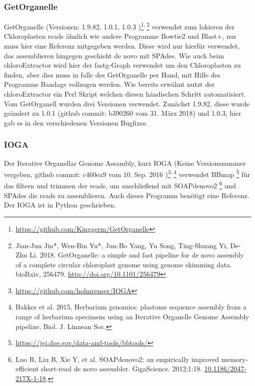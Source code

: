 \documentclass{scrartcl}
\begin{document}
\subsubsection{GetOrganelle}
\label{sec-1-5-5}
GetOrganelle (Versionen: 1.9.82, 1.0.1, 1.0.3 )\footnote{\url{https://github.com/Kinggerm/GetOrganelle}}\textsuperscript{,}\,\footnote{Jian-Jun Jin*, Wen-Bin Yu*, Jun-Bo Yang, Yu Song, Ting-Shuang Yi, De-Zhu Li. 2018. GetOrganelle: a simple and fast pipeline for de novo assembly of a complete circular chloroplast genome using genome skimming data. bioRxiv, 256479. \url{http://doi.org/10.1101/256479}} verwendet zum lokieren der Chloroplasten reads ähnlich wie andere Programme Bowtie2 \footnotemark[12]{} und Blast+, nur muss hier eine Referenz mitgegeben werden. Diese wird nur hierfür
verwendet, das assemblieren hingegen geschieht de novo mit SPAdes. Wie auch beim chloroExtractor wird hier der fastg-Graph verwendet um den Chloroplasten zu finden, aber dies muss in falle 
des GetOrganelle per Hand, mit Hilfe des Programms Bandage vollzogen werden. Wie bereits erwähnt nutzt der chloroExtractor ein Perl Skript welchen diesen händischen Schritt automatisiert. 
Vom GetOrganell wurden drei Versionen verwendet. Zunächst 1.9.82, diese wurde geändert zu 1.0.1 (github commit: b390260 vom 31. März 2018) und 1.0.3, hier gab es in den verschiedenen Versionen Bugfixes.
\subsubsection{IOGA}
\label{sec-1-5-6}
Der Iterative Organellar Genome Assambly, kurz IOGA (Keine Versionsnummer vergeben, github commit: c460ea9 vom 10. Sep. 2016 )\footnote{\url{https://github.com/holmrenser/IOGA}}\textsuperscript{,}\,\footnote{Bakker et al. 2015, Herbarium genomics: plastome sequence assembly from a range of herbarium specimens using an Iterative Organelle Genome Assembly pipeline, Biol. J. Linnean Soc.} verwendet BBmap \footnote{\url{https://jgi.doe.gov/data-and-tools/bbtools/}} für das filtern und trimmen der reads, um anschließend mit SOAPdenovo2 \footnote{Luo R, Liu B, Xie Y, et al. SOAPdenovo2: an empirically improved memory-efficient short-read de novo assembler. GigaScience. 2012;1:18. \url{10.1186/2047-217X-1-18}.} und SPAdes \footnotemark[13]{} die reads zu assemblieren. 
Auch dieses Programm benötigt eine Referenz. Der IOGA ist in Python geschrieben.
\end{document}

